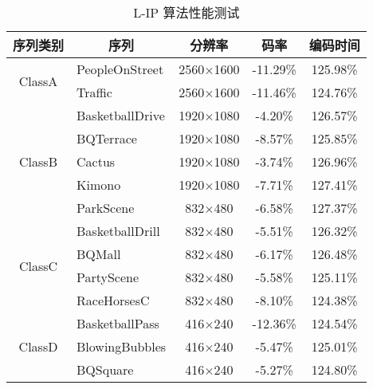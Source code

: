 \begin{table}[!p]
    \centering
    \caption{L-IP 算法性能测试}
    \label{tab:L-IPSummary}
    \begin{tabular}{@{}clccc@{}}
        \toprule
        序列类别                               & \multicolumn{1}{c}{序列}     & 分辨率           & 码率     & 编码时间 \\ \midrule
        \multirow{2}{*}{ClassA}                & PeopleOnStreet               & 2560$\times$1600 & -11.29\% & 125.98\% \\
                                               & Traffic                      & 2560$\times$1600 & -11.46\% & 124.76\% \\
        \multirow{5}{*}{ClassB}                & BasketballDrive              & 1920$\times$1080 & -4.20\%  & 126.57\% \\
                                               & BQTerrace                    & 1920$\times$1080 & -8.57\%  & 125.85\% \\
                                               & Cactus                       & 1920$\times$1080 & -3.74\%  & 126.96\% \\
                                               & Kimono                       & 1920$\times$1080 & -7.71\%  & 127.41\% \\
                                               & ParkScene                    & 832$\times$480   & -6.58\%  & 127.37\% \\
        \multirow{4}{*}{ClassC}                & BasketballDrill              & 832$\times$480   & -5.51\%  & 126.32\% \\
                                               & BQMall                       & 832$\times$480   & -6.17\%  & 126.48\% \\
                                               & PartyScene                   & 832$\times$480   & -5.58\%  & 125.11\% \\
                                               & RaceHorsesC                  & 832$\times$480   & -8.10\%  & 124.38\% \\
        \multirow{4}{*}{ClassD}                & BasketballPass               & 416$\times$240   & -12.36\% & 124.54\% \\
                                               & BlowingBubbles               & 416$\times$240   & -5.47\%  & 125.01\% \\
                                               & BQSquare                     & 416$\times$240   & -5.27\%  & 124.80\% \\

\end{tabular}
\end{table}
